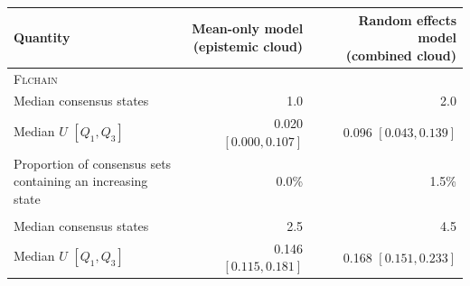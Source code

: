 \begin{tabular}{lrr}
\toprule
Quantity & \makecell{Mean-only model\\(epistemic cloud)} & \makecell{Random effects model\\(combined cloud)} \\
\midrule
\multicolumn{3}{l}{\textsc{Flchain}} \\
Median consensus states & 1.0 & 2.0 \\
Median $U$ $[Q_1, Q_3]$ & 0.020 $[0.000, 0.107]$ & 0.096 $[0.043, 0.139]$ \\
\makecell[l]{Proportion of consensus sets\\containing an increasing state} & 0.0\% & 1.5\% \\
\addlinespace
\midrule
\multicolumn{3}{l}{\textsc{Airfoil}} \\
Median consensus states & 2.5 & 4.5 \\
Median $U$ $[Q_1, Q_3]$ & 0.146 $[0.115, 0.181]$ & 0.168 $[0.151, 0.233]$ \\
\bottomrule
\end{tabular}
